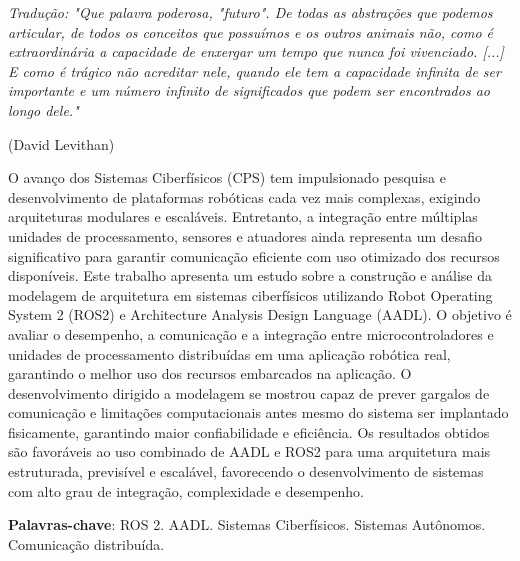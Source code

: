 \documentclass[
    12pt, 
    a4paper, 
    chapter=TITLE,		%
    section=TITLE,		%
    oneside,            %
    english
]{abntex2}
\begin{document}
\frontmatter  %
\setcounter{page}{1}
\imprimircapa
\imprimirfolhaderosto


\begin{epigrafe}
\begin{flushright} 
\vspace*{\fill}

    \textit{Tradução: "Que palavra poderosa, "futuro". De todas as abstrações que podemos articular, de todos os conceitos que possuímos e os outros animais não, como é extraordinária a capacidade de enxergar um tempo que nunca foi vivenciado. [...] E como é trágico não acreditar nele, quando ele tem a capacidade infinita de ser importante e um número infinito de significados que podem ser encontrados ao longo dele."}
    
    (David Levithan)

\end{flushright}
\end{epigrafe}




\begin{resumo}
O avanço dos Sistemas Ciberfísicos (CPS) tem impulsionado pesquisa e desenvolvimento de plataformas robóticas cada vez mais complexas, exigindo arquiteturas modulares e escaláveis. Entretanto, a integração entre múltiplas unidades de processamento, sensores e atuadores ainda representa um desafio significativo para garantir comunicação eficiente com uso otimizado dos recursos disponíveis.
Este trabalho apresenta um estudo sobre a construção e análise da modelagem de arquitetura em sistemas ciberfísicos utilizando Robot Operating System 2 (ROS2) e Architecture Analysis Design Language (AADL). O objetivo é avaliar o desempenho, a comunicação e a integração entre microcontroladores e unidades de processamento distribuídas em uma aplicação robótica real, garantindo o melhor uso dos recursos embarcados na aplicação. 
O desenvolvimento dirigido a modelagem se mostrou capaz de prever gargalos de comunicação e limitações computacionais antes mesmo do sistema ser implantado fisicamente, garantindo maior confiabilidade e eficiência. Os resultados obtidos são favoráveis ao uso combinado de AADL e ROS2 para uma arquitetura mais estruturada, previsível e escalável, favorecendo o desenvolvimento de sistemas com alto grau de integração, complexidade e desempenho.

\textbf{Palavras-chave}: ROS 2. AADL. Sistemas Ciberfísicos. Sistemas Autônomos. Comunicação distribuída.
\end{resumo}
\end{document}
